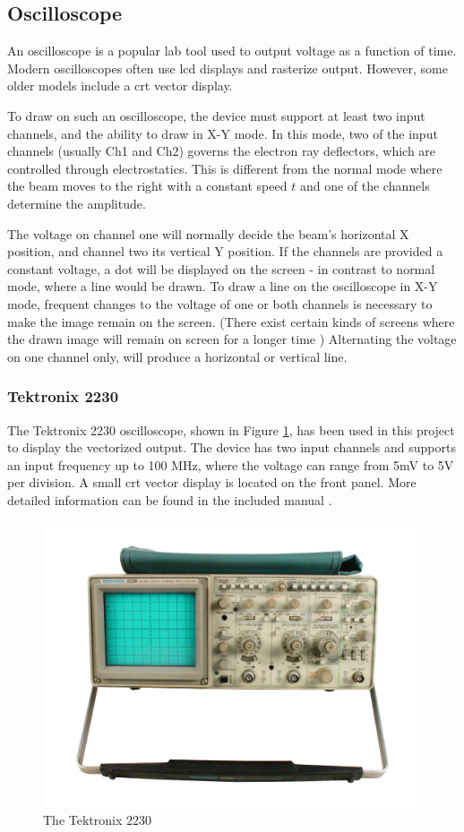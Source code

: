 \subsection{Oscilloscope}
An oscilloscope is a popular lab tool used to output voltage as a function of time.
Modern oscilloscopes often use \gls{lcd} displays and rasterize output.
However, some older models include a \gls{crt} vector display.

To draw on such an oscilloscope, the device must support at least two input channels, and the ability to draw in X-Y mode.
In this mode, two of the input channels (usually Ch1 and Ch2) governs the electron ray deflectors, which are controlled through electrostatics.
This is different from the normal mode where the beam moves to the right with a constant speed \( t \) and one of the channels determine the amplitude.

The voltage on channel one will normally decide the beam's horizontal X position, and channel two its vertical Y position.
If the channels are provided a constant voltage, a dot will be displayed on the screen - in contrast to normal mode, where a line would be drawn.
To draw a line on the oscilloscope in X-Y mode, frequent changes to the voltage of one or both channels is necessary to make the image remain on the screen.
(There exist certain kinds of screens where the drawn image will remain on screen for a longer time \cite{tektronix4010})
Alternating the voltage on one channel only, will produce a horizontal or vertical line.

\subsubsection{Tektronix 2230}
The Tektronix 2230 oscilloscope, shown in Figure \ref{fig:oscilloscope}, has been used in this project to display the vectorized output.
The device has two input channels and supports an input frequency up to 100 MHz, where the voltage can range from 5mV to 5V per division.
A small \gls{crt} vector display is located on the front panel.
More detailed information can be found in the included manual \cite{tektronix2230}.

\begin{figure}[h!]
	\centering
	\includegraphics[width=0.6\linewidth]{images/oscilloscope.jpg}
    \caption{The Tektronix 2230 \cite{oscilloscope}}
    \label{fig:oscilloscope}
\end{figure}
